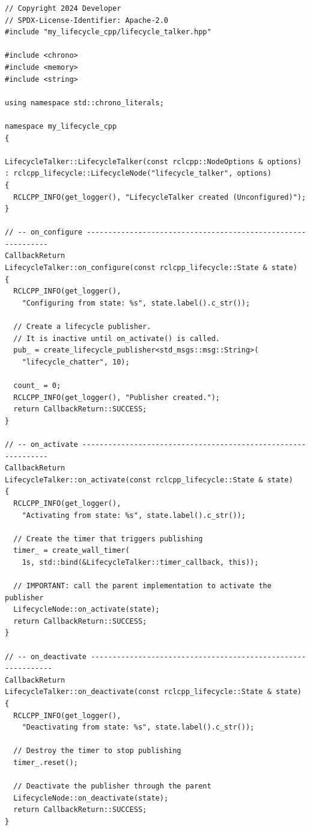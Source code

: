 \documentclass[11pt,a4paper]{csarticle}
\begin{document}
\begin{lstlisting}[style=cpp,caption={src/lifecycle\_talker.cpp}]
// Copyright 2024 Developer
// SPDX-License-Identifier: Apache-2.0
#include "my_lifecycle_cpp/lifecycle_talker.hpp"

#include <chrono>
#include <memory>
#include <string>

using namespace std::chrono_literals;

namespace my_lifecycle_cpp
{

LifecycleTalker::LifecycleTalker(const rclcpp::NodeOptions & options)
: rclcpp_lifecycle::LifecycleNode("lifecycle_talker", options)
{
  RCLCPP_INFO(get_logger(), "LifecycleTalker created (Unconfigured)");
}

// -- on_configure -------------------------------------------------------------
CallbackReturn
LifecycleTalker::on_configure(const rclcpp_lifecycle::State & state)
{
  RCLCPP_INFO(get_logger(),
    "Configuring from state: %s", state.label().c_str());

  // Create a lifecycle publisher.
  // It is inactive until on_activate() is called.
  pub_ = create_lifecycle_publisher<std_msgs::msg::String>(
    "lifecycle_chatter", 10);

  count_ = 0;
  RCLCPP_INFO(get_logger(), "Publisher created.");
  return CallbackReturn::SUCCESS;
}

// -- on_activate --------------------------------------------------------------
CallbackReturn
LifecycleTalker::on_activate(const rclcpp_lifecycle::State & state)
{
  RCLCPP_INFO(get_logger(),
    "Activating from state: %s", state.label().c_str());

  // Create the timer that triggers publishing
  timer_ = create_wall_timer(
    1s, std::bind(&LifecycleTalker::timer_callback, this));

  // IMPORTANT: call the parent implementation to activate the publisher
  LifecycleNode::on_activate(state);
  return CallbackReturn::SUCCESS;
}

// -- on_deactivate -------------------------------------------------------------
CallbackReturn
LifecycleTalker::on_deactivate(const rclcpp_lifecycle::State & state)
{
  RCLCPP_INFO(get_logger(),
    "Deactivating from state: %s", state.label().c_str());

  // Destroy the timer to stop publishing
  timer_.reset();

  // Deactivate the publisher through the parent
  LifecycleNode::on_deactivate(state);
  return CallbackReturn::SUCCESS;
}


\end{lstlisting}
\end{document}
